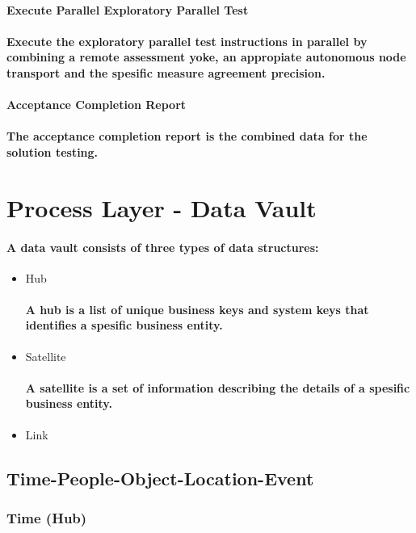 \documentclass{acm_proc_article-sp}
\begin{document}
\paragraph{Execute Parallel Exploratory Parallel Test}
\paragraph{Execute the exploratory parallel test instructions in parallel by combining a remote assessment yoke, an appropiate autonomous node transport and the spesific measure agreement precision.}
\paragraph{Acceptance Completion Report}
\paragraph{The acceptance completion report is the combined data for the solution testing.}
\pagebreak
\section{Process Layer - Data Vault}
\paragraph{A data vault consists of three types of data structures:}
\begin{itemize}
\item{Hub}
\paragraph{A hub is a list of unique business keys and system keys that identifies a spesific business entity.}
\item{Satellite}
\paragraph{A satellite is a set of information describing the details of a spesific business entity.}
\item{Link}
\end{itemize}

\subsection{Time-People-Object-Location-Event}
\subsubsection{Time (Hub)}
\end{document}
